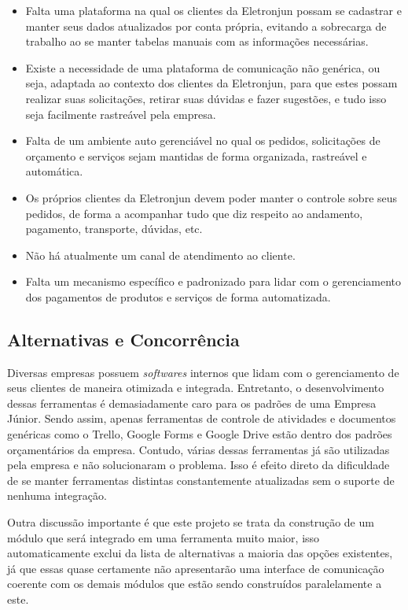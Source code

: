       \begin{itemize}
        \item Falta uma plataforma na qual os clientes da Eletronjun possam se cadastrar e manter seus dados atualizados por conta própria, evitando a sobrecarga de trabalho ao se manter tabelas manuais com as informações necessárias.
        \item Existe a necessidade de uma plataforma de comunicação não genérica, ou seja, adaptada ao contexto dos clientes da Eletronjun, para que estes possam realizar suas solicitações, retirar suas dúvidas e fazer sugestões, e tudo isso seja facilmente rastreável pela empresa.
        \item Falta de um ambiente auto gerenciável no qual os pedidos, solicitações de orçamento e serviços sejam mantidas de forma organizada, rastreável e automática. 
        \item Os próprios clientes da Eletronjun devem poder manter o controle sobre seus pedidos, de forma a acompanhar tudo que diz respeito ao andamento, pagamento, transporte, dúvidas, etc.
        \item Não há atualmente um canal de atendimento ao cliente.
        \item Falta um mecanismo específico e padronizado para lidar com o gerenciamento dos pagamentos de produtos e serviços de forma automatizada.
      \end{itemize}

    \subsection{Alternativas e Concorrência}
Diversas empresas possuem \textit{softwares} internos que lidam com o gerenciamento de seus clientes de maneira otimizada e integrada. Entretanto, o desenvolvimento dessas ferramentas é demasiadamente caro para os padrões de uma Empresa Júnior. Sendo assim, apenas ferramentas de controle de atividades e documentos genéricas como o Trello, Google Forms e Google Drive estão dentro dos padrões orçamentários da empresa. Contudo, várias dessas ferramentas já são utilizadas pela empresa e não solucionaram o problema. Isso é efeito direto da dificuldade de se manter ferramentas distintas constantemente atualizadas sem o suporte de nenhuma integração.

Outra discussão importante é que este projeto se trata da construção de um módulo que será integrado em uma ferramenta muito maior, isso automaticamente exclui da lista de alternativas a maioria das opções existentes, já que essas quase certamente não apresentarão uma interface de comunicação coerente com os demais módulos que estão sendo construídos paralelamente a este.


